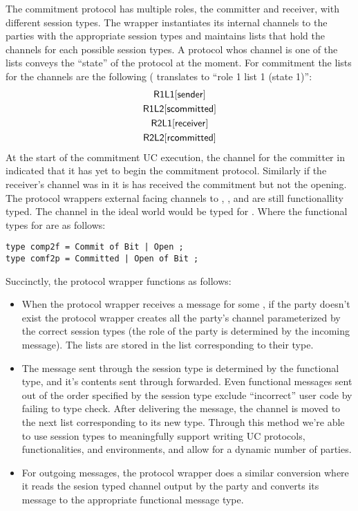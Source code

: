The commitment protocol has multiple roles, the committer and receiver, with different session types. 
The wrapper instantiates its internal channels to the parties with the appropriate session types and maintains lists that hold the channels for each possible session types.
A protocol whos channel is one of the lists conveys the ``state'' of the protocol at the moment.
For commitment the lists for the  channels are the following ( translates to ``role 1 list 1 (state 1)'':
\begin{gather}
	\mathsf{R1L1}[\mathsf{sender}] \\
	\mathsf{R1L2}[\mathsf{scommitted}] \\
	\mathsf{R2L1}[\mathsf{receiver}] \\
	\mathsf{R2L2}[\mathsf{rcommitted}] 
\end{gather}
At the start of the commitment UC execution, the  channel for the committer in  indicated that it has yet to begin the commitment protocol.
Similarly if the receiver's channel was in  it is has received the commitment but not the opening.
The protocol wrappers external facing channels to \A, \F, and \Z are still functionallity typed. 
The  channel in the ideal world would be typed  for \Fcom.
Where the functional types for \Fcom are as follows:
\begin{lstlisting}[basicstyle=\small\BeraMonottFamily]
type comp2f = Commit of Bit | Open ;
type comf2p = Committed | Open of Bit ;
\end{lstlisting}

Succinctly, the protocol wrapper functions as follows:
\begin{itemize}
\item When the protocol wrapper receives a message for some , if the party doesn't exist the protocol wrapper creates all the party's channel parameterized by the correct session types (the role of the party is determined by the incoming message). The lists are stored in the list corresponding to their type. 
\item The message sent through the session type is determined by the functional type, and it's contents sent through forwarded.
Even functional messages sent out of the order specified by the session type exclude ``incorrect'' user code by failing to type check.
After delivering the message, the channel is moved to the next list corresponding to its new type.
Through this method we're able to use session types to meaningfully support writing UC protocols, functionalities, and environments, and allow for a dynamic number of parties.
\item For outgoing messages, the protocol wrapper does a similar conversion where it reads the sesion typed channel output by the party and converts its message to the appropriate functional message type.
\end{itemize}

